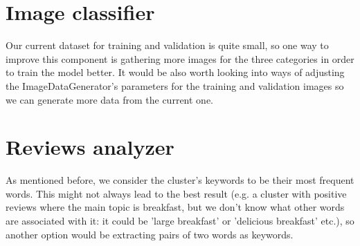 \documentclass[runningheads,a4paper,11pt]{report}
\begin{document}
\section{Image classifier}
Our current dataset for training and validation is quite small, so one way to improve this component is gathering more images for the three categories in order to train the model better. It would be also worth looking into ways of adjusting the ImageDataGenerator's parameters for the training and validation images so we can generate more data from the current one.

\section{Reviews analyzer}
As mentioned before, we consider the cluster's keywords to be their most frequent words. This might not always lead to the best result (e.g. a cluster with positive reviews where the main topic is breakfast, but we don't know what other words are associated with it: it could be 'large breakfast' or 'delicious breakfast' etc.), so another option would be extracting pairs of two words as keywords.

%
%
\end{document}
